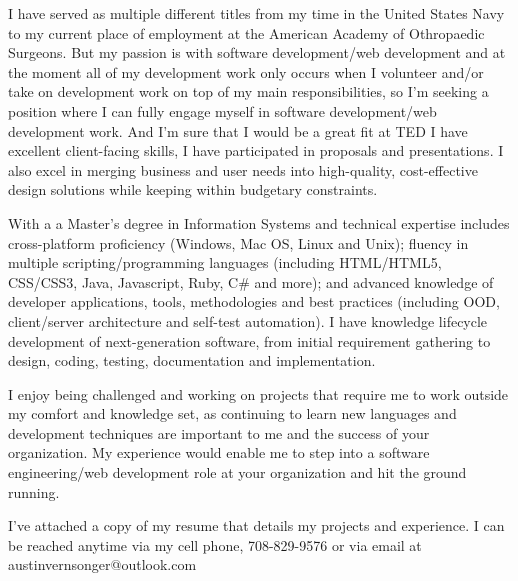 \documentclass[9pt, a4paper]{awesome-cv}
\begin{document}
\makecvheader

\makelettertitle

\begin{cvletter}




I have served as multiple different titles from my time in the United States Navy to my current place of employment at the American Academy of Othropaedic Surgeons. But my passion is with software development/web development and at the moment all of my development work only occurs when I volunteer and/or take on development work on top of my main responsibilities, so I'm seeking a position where I can fully engage myself in software development/web development work. And I'm sure that I would be a great fit at
TED
I have excellent client-facing skills, I have participated in proposals and presentations. I also excel in merging business and user needs into high-quality, cost-effective design solutions while keeping within budgetary constraints. 

With a a Master’s degree in Information Systems and technical expertise includes cross-platform proficiency (Windows, Mac OS, Linux and Unix); fluency in multiple scripting/programming languages (including HTML/HTML5, CSS/CSS3, Java, Javascript, Ruby, C# and more); and advanced knowledge of developer applications, tools, methodologies and best practices (including OOD, client/server architecture and self-test automation). I have knowledge lifecycle development of next-generation software, from initial requirement gathering to design, coding, testing, documentation and implementation.

I enjoy being challenged and working on projects that require me to work outside my comfort and knowledge set, as continuing to learn new languages and development techniques are important to me and the success of your organization. My experience would enable me to step into a software engineering/web development role at your organization and hit the ground running.

I’ve attached a copy of my resume that details my projects and experience. I can be reached anytime via my cell phone, 708-829-9576 or via email at austinvernsonger@outlook.com

\end{cvletter}

\makeletterclosing
\end{document}
